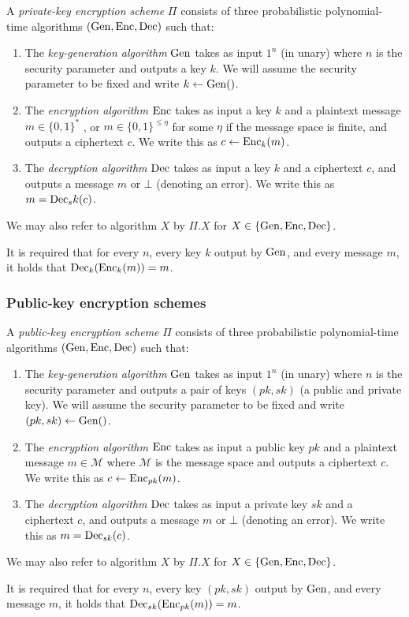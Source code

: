 \begin{definition}
	A \emph{private-key encryption scheme} $\Pi$ consists of three probabilistic polynomial-time algorithms $(\mathrm{Gen}, \mathrm{Enc}, \mathrm{Dec})$ such that:
	\begin{enumerate}[1.]
		\item The \emph{key-generation algorithm} $\mathrm{Gen}$ takes as input $1^n$ (in unary) where $n$ is the security parameter and outputs a key $k$. We will assume the security parameter to be fixed and write $k \leftarrow \mathrm{Gen}()$.
		\item The \emph{encryption algorithm} $\mathrm{Enc}$ takes as input a key $k$ and a plaintext message $m \in \{0, 1\}^*$ , or $m \in \{0, 1\}^{\le \eta}$ for some $\eta$ if the message space is finite, and outputs a ciphertext $c$. We write this as $c \leftarrow \mathrm{Enc}_k(m)$.
		\item The \emph{decryption algorithm} $\mathrm{Dec}$ takes as input a key $k$ and a ciphertext $c$, and outputs a message $m$ or $\bot$ (denoting an error). We write this as $m = \mathrm{Dec}_sk(c)$.
	\end{enumerate}

	We may also refer to algorithm $X$ by $\Pi.X$ for $X \in \{\mathrm{Gen}, \mathrm{Enc}, \mathrm{Dec}\}$.

	It is required that for every $n$, every key $k$ output by $\mathrm{Gen}$, and every message $m$, it holds that $\mathrm{Dec}_k(\mathrm{Enc}_k(m)) = m$.
\end{definition}

\subsubsection{Public-key encryption schemes}

\begin{definition}
	A \emph{public-key encryption scheme} $\Pi$ consists of three probabilistic polynomial-time algorithms $(\mathrm{Gen}, \mathrm{Enc}, \mathrm{Dec})$ such that:
	\begin{enumerate}[1.]
		\item The \emph{key-generation algorithm} $\mathrm{Gen}$ takes as input $1^n$ (in unary) where $n$ is the security parameter and outputs a pair of keys $(pk, sk)$ (a public and private key). We will assume the security parameter to be fixed and write $(pk, sk) \leftarrow \mathrm{Gen}()$.
		\item The \emph{encryption algorithm} $\mathrm{Enc}$ takes as input a public key $pk$ and a plaintext message $m \in \mathcal{M}$ where $\mathcal{M}$ is the message space and outputs a ciphertext $c$. We write this as $c \leftarrow \mathrm{Enc}_{pk}(m)$.
		\item The \emph{decryption algorithm} $\mathrm{Dec}$ takes as input a private key $sk$ and a ciphertext $c$, and outputs a message $m$ or $\bot$ (denoting an error). We write this as $m = \mathrm{Dec}_{sk}(c)$.
	\end{enumerate}

	We may also refer to algorithm $X$ by $\Pi.X$ for $X \in \{\mathrm{Gen}, \mathrm{Enc}, \mathrm{Dec}\}$.

	It is required that for every $n$, every key $(pk, sk)$ output by $\mathrm{Gen}$, and every message $m$, it holds that $\mathrm{Dec}_{sk}(\mathrm{Enc}_{pk}(m)) = m$.
\end{definition}

